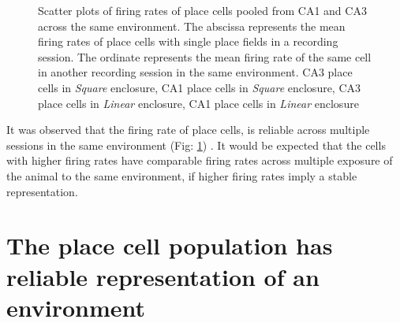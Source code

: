 \begin{figure}[htb!]
\centering
{}

\caption[Rate Remapping]{Scatter plots of firing rates of place cells pooled from CA1 and CA3  across the same environment. The abscissa represents the mean firing rates of place cells with single place fields in a recording session. The ordinate represents the mean firing rate of the same cell in another recording session in the same environment.  CA3 place cells in \emph{Square} enclosure,  CA1 place cells in \emph{Square} enclosure,  CA3 place cells in \emph{Linear} enclosure,  CA1 place cells in \emph{Linear} enclosure}
\label{fig:rateremapping}
\end{figure}





It was observed that the firing rate of place cells, is reliable across multiple sessions in the same environment (Fig:  \ref{fig:rateremapping}) . It would be expected that the cells with higher firing rates have comparable firing rates across multiple exposure of the animal to the same environment, if higher firing rates imply a stable representation. \\



\section[Population activity within a fixed environment]{The place cell population has reliable representation of an environment}

